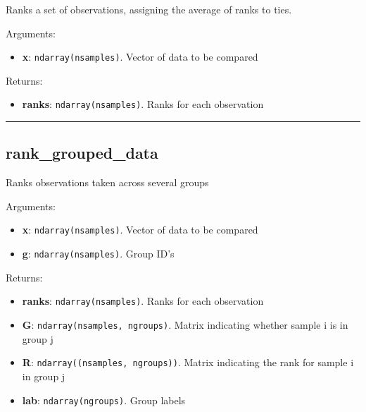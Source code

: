 Ranks a set of observations, assigning the average of ranks to ties.

Arguments:

\begin{itemize}
\tightlist
\item
  \textbf{x}: \texttt{ndarray(nsamples)}. Vector of data to be compared
\end{itemize}

Returns:

\begin{itemize}
\tightlist
\item
  \textbf{ranks}: \texttt{ndarray(nsamples)}. Ranks for each observation
\end{itemize}

\begin{center}\rule{0.5\linewidth}{\linethickness}\end{center}

\subsection{rank\_grouped\_data}\label{rank_grouped_data}

\begin{Shaded}
\begin{Highlighting}[]
\end{Highlighting}
\end{Shaded}

Ranks observations taken across several groups

Arguments:

\begin{itemize}
\tightlist
\item
  \textbf{x}: \texttt{ndarray(nsamples)}. Vector of data to be compared
\item
  \textbf{g}: \texttt{ndarray(nsamples)}. Group ID's
\end{itemize}

Returns:

\begin{itemize}
\tightlist
\item
  \textbf{ranks}: \texttt{ndarray(nsamples)}. Ranks for each observation
\item
  \textbf{G}: \texttt{ndarray(nsamples,\ ngroups)}. Matrix indicating
  whether sample i is in group j
\item
  \textbf{R}: \texttt{ndarray((nsamples,\ ngroups))}. Matrix indicating
  the rank for sample i in group j
\item
  \textbf{lab}: \texttt{ndarray(ngroups)}. Group labels
\end{itemize}

